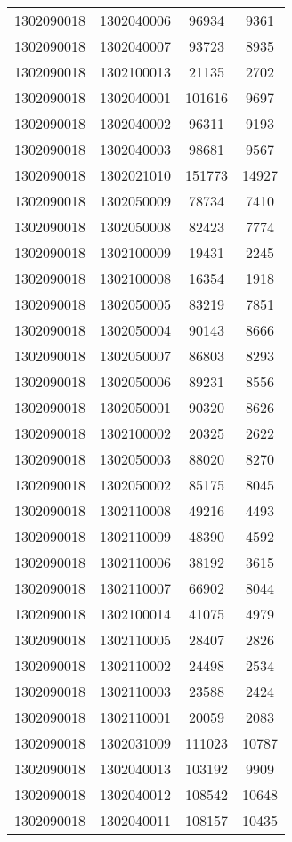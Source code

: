 \begin{longtable}{llcc}
1302090018 & 1302040006 & 96934 & 9361\\
1302090018 & 1302040007 & 93723 & 8935\\
1302090018 & 1302100013 & 21135 & 2702\\
1302090018 & 1302040001 & 101616 & 9697\\
1302090018 & 1302040002 & 96311 & 9193\\
1302090018 & 1302040003 & 98681 & 9567\\
1302090018 & 1302021010 & 151773 & 14927\\
1302090018 & 1302050009 & 78734 & 7410\\
1302090018 & 1302050008 & 82423 & 7774\\
1302090018 & 1302100009 & 19431 & 2245\\
1302090018 & 1302100008 & 16354 & 1918\\
1302090018 & 1302050005 & 83219 & 7851\\
1302090018 & 1302050004 & 90143 & 8666\\
1302090018 & 1302050007 & 86803 & 8293\\
1302090018 & 1302050006 & 89231 & 8556\\
1302090018 & 1302050001 & 90320 & 8626\\
1302090018 & 1302100002 & 20325 & 2622\\
1302090018 & 1302050003 & 88020 & 8270\\
1302090018 & 1302050002 & 85175 & 8045\\
1302090018 & 1302110008 & 49216 & 4493\\
1302090018 & 1302110009 & 48390 & 4592\\
1302090018 & 1302110006 & 38192 & 3615\\
1302090018 & 1302110007 & 66902 & 8044\\
1302090018 & 1302100014 & 41075 & 4979\\
1302090018 & 1302110005 & 28407 & 2826\\
1302090018 & 1302110002 & 24498 & 2534\\
1302090018 & 1302110003 & 23588 & 2424\\
1302090018 & 1302110001 & 20059 & 2083\\
1302090018 & 1302031009 & 111023 & 10787\\
1302090018 & 1302040013 & 103192 & 9909\\
1302090018 & 1302040012 & 108542 & 10648\\
1302090018 & 1302040011 & 108157 & 10435\\

\end{longtable}
